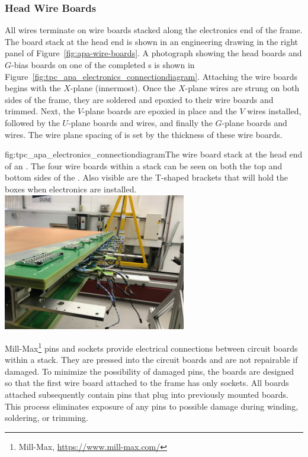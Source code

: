\subsubsection{Head Wire Boards}
\label{sec:fdsp-apa-headboards}

All  wires terminate on wire boards stacked along the electronics end of the  frame.  The board stack at the head end is shown in an engineering drawing in the right panel of Figure~\ref{fig:apa-wire-boards}. A photograph showing the head boards and $G$-bias boards on one of the completed  s is shown in Figure~\ref{fig:tpc_apa_electronics_connectiondiagram}. Attaching the wire boards begins with the $X$-plane (innermost). Once the $X$-plane wires are strung on both sides of the  frame, they are soldered and epoxied to their wire boards and trimmed. Next, the $V$-plane boards are epoxied in place and the $V$ wires installed, followed by the $U$-plane boards and wires, and finally the $G$-plane boards and wires. The wire plane spacing of \planespace %
is set by the thickness of these wire boards.   

\begin{dunefigure}{fig:tpc_apa_electronics_connectiondiagram}{The wire board stack at the head end of an . The four wire boards within a stack can be seen on both the top and bottom sides of the .  Also visible are the T-shaped brackets that will hold the  boxes when electronics are installed.   
}
\includegraphics[width=0.6\textwidth, trim=0mm 0mm 0mm 15mm, clip]{graphics/sp-apa-board-stack.png}
\end{dunefigure} 

Mill-Max\footnote{Mill-Max\texttrademark{}, \url{https://www.mill-max.com/}} pins and sockets provide electrical connections between circuit boards within a stack. They are pressed into the circuit boards and are not repairable if damaged. To minimize the possibility of damaged pins, the boards are designed so that the first wire board attached to the frame has only sockets. All boards attached subsequently contain pins that plug into previously mounted boards. This process eliminates exposure of any pins to possible damage during winding, soldering, or trimming.


